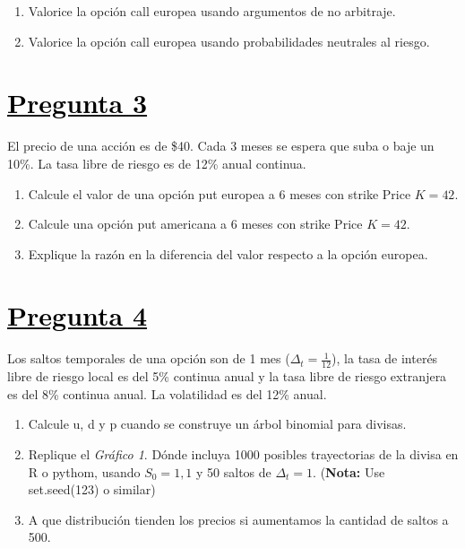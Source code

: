 \documentclass[12pt]{article}
\newcommand{\subrayadoRojo}[1]{{\color{rojoudp}\underline{\textcolor{black}{#1}}}}
\begin{document}
\begin{enumerate}[label=\textbf{\alph*)}]
    \item	Valorice la opción call europea usando argumentos de no arbitraje. 
    \item	Valorice la opción call europea usando probabilidades neutrales al riesgo.
\end{enumerate}


\section*{\subrayadoRojo{Pregunta 3}}
El precio de una acción es de \$40. Cada 3 meses se espera que suba o baje un 10\%.
La tasa libre de riesgo es de 12\% anual continua. 

\begin{enumerate}[label=\textbf{\alph*)}]

    \item	Calcule el valor de una opción put europea a 6 meses con strike Price $K=42$.
    \item   Calcule una opción put americana a 6 meses con strike Price $K=42$.
    \item   Explique la razón en la diferencia del valor respecto a la opción europea.

\end{enumerate}

\section*{\subrayadoRojo{Pregunta 4}}
Los saltos temporales de una opción son de 1 mes ($\Delta_t=\frac{1}{12}$), la tasa de interés libre de riesgo 
local es del 5\% continua anual y la tasa libre de riesgo extranjera es del 8\% continua anual. 
La volatilidad es del 12\% anual.

\begin{enumerate}[label=\textbf{\alph*)}]
    \item   Calcule u, d y p cuando se construye un árbol binomial para divisas. 
    \item   Replique el \textit{Gráfico 1}. Dónde incluya 1000 posibles trayectorias de la divisa en R o pythom, usando $S_0=1,1$ y 50 saltos de $\Delta_t=1$. {\footnotesize(\textbf{Nota:} Use set.seed(123) o similar)}
    \item   A que distribución tienden los precios si aumentamos la cantidad de saltos a 500. 
\end{enumerate}
\end{document}
